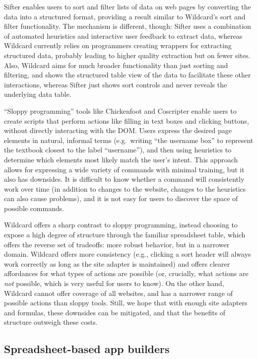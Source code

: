 \documentclass[english,submission]{programming}
\begin{document}
Sifter \autocite{huynh2006} enables users to sort and filter lists of
data on web pages by converting the data into a structured format,
providing a result similar to Wildcard's sort and filter functionality.
The mechanism is different, though: Sifter uses a combination of
automated heuristics and interactive user feedback to extract data,
whereas Wildcard currently relies on programmers creating wrappers for
extracting structured data, probably leading to higher quality
extraction but on fewer sites. Also, Wildcard aims for much broader
functionality than just sorting and filtering, and shows the structured
table view of the data to facilitate these other interactions, whereas
Sifter just shows sort controls and never reveals the underlying data
table.

``Sloppy programming'' \autocite{little2010} tools like Chickenfoot
\autocite{bolin2005} and Coscripter \autocite{leshed2008} enable users
to create scripts that perform actions like filling in text boxes and
clicking buttons, without directly interacting with the DOM. Users
express the desired page elements in natural, informal terms
(e.g.~writing ``the username box'' to represent the textbook closest to
the label ``username''), and then using heuristics to determine which
elements most likely match the user's intent. This approach allows for
expressing a wide variety of commands with minimal training, but it also
has downsides. It is difficult to know whether a command will
consistently work over time (in addition to changes to the website,
changes to the heuristics can also cause problems), and it is not easy
for users to discover the space of possible commands.

Wildcard offers a sharp contrast to sloppy programming, instead choosing
to expose a high degree of structure through the familiar spreadsheet
table, which offers the reverse set of tradeoffs: more robust behavior,
but in a narrower domain. Wildcard offers more consistency (e.g.,
clicking a sort header will always work correctly as long as the site
adapter is maintained) and offers clearer affordances for what types of
actions are possible (or, crucially, what actions are \emph{not}
possible, which is very useful for users to know). On the other hand,
Wildcard cannot offer coverage of all websites, and has a narrower range
of possible actions than sloppy tools. Still, we hope that with enough
site adapters and formulas, these downsides can be mitigated, and that
the benefits of structure outweigh these costs.

\hypertarget{spreadsheet-based-app-builders}{%
\subsection{Spreadsheet-based app
builders}\label{spreadsheet-based-app-builders}}
\end{document}
